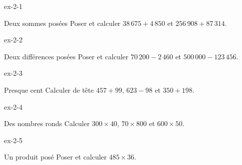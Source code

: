 \clearpage{}
\begin{blocLivre}{ex-2-1}\begin{exercice}[1]{Deux sommes posées}
Poser et calculer $38\,675+4\,850$ et $256\,908+87\,314$.
\end{exercice}\end{blocLivre}
\begin{blocLivre}{ex-2-2}\begin{exercice}[1]{Deux différences posées}
Poser et calculer $70\,200-2\,460$ et $500\,000-123\,456$.
\end{exercice}\end{blocLivre}
\begin{blocLivre}{ex-2-3}\begin{exercice}[1]{Presque cent}
Calculer de tête $457+99$, $623-98$ et $350+198$.
\end{exercice}\end{blocLivre}
\begin{blocLivre}{ex-2-4}\begin{exercice}[1]{Des nombres ronds}
Calculer $300\times40$, $70\times800$ et $600\times50$.
\end{exercice}\end{blocLivre}
\begin{blocLivre}{ex-2-5}\begin{exercice}[1]{Un produit posé}
Poser et calculer $485\times36$.
\end{exercice}\end{blocLivre}

